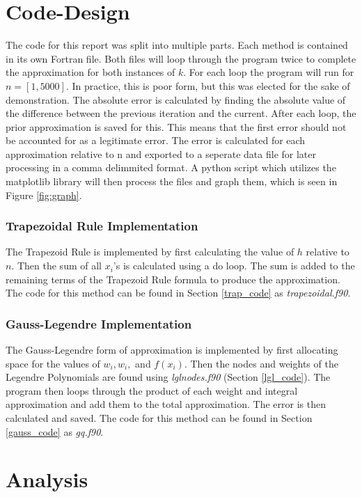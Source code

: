 \documentclass[12pt]{article}
\begin{document}
\section{Code-Design}
The code for this report was split into multiple parts. Each method is contained in its own
Fortran file. Both files will loop through the program twice to complete the approximation
for both instances of \(k\). For each loop the program will run for \(n = [1,5000]\). In practice,
this is poor form, but this was elected for the sake of demonstration. The absolute error is calculated
by finding the absolute value of the difference between the previous iteration and the current.
After each loop, the prior approximation is saved for this. This means that the first error should not be
accounted for as a legitimate error. The error is calculated 
for each approximation relative to n and exported to a seperate data file for later
processing in a comma delimmited format. A python script which utilizes the matplotlib library will
then process the files and graph them, which is seen in Figure \ref{fig:graph}. 

\subsubsection{Trapezoidal Rule Implementation}
The Trapezoid Rule is implemented by first calculating the value of \(h\) relative to
\(n\). Then the sum of all \(x_i\)'s is calculated using a do loop. The sum is added
to the remaining terms of the Trapezoid Rule formula to produce the
approximation. The code for this method can be found in Section \ref{trap_code} as
\emph{trapezoidal.f90}.

\subsubsection{Gauss-Legendre Implementation}
The Gauss-Legendre form of approximation is implemented by first allocating space for the
values of \(w_i, w_i,\) and \(f(x_i)\). Then the nodes and weights of the Legendre Polynomials
are found using \emph{lglnodes.f90} (Section \ref{lgl_code}). The program then loops through
the product of each weight and integral approximation and add them to the total approximation.
The error is then calculated and saved. The code for this method can be found in Section \ref{gauss_code} as
\emph{gq.f90}.


\section{Analysis}
\end{document}
